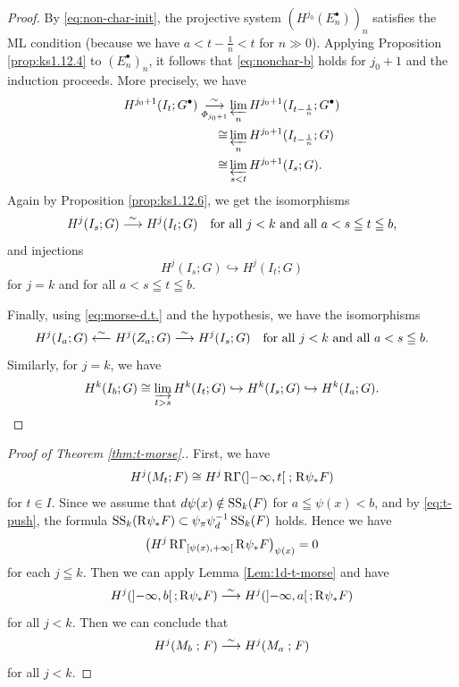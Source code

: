 \begin{proof}
  By \eqref{eq:non-char-init}, the projective system \(
    (H^{j_0}(E^{\bullet}_{n}))_{n}
  \) satisfies the ML condition (because we have \(
    a<t-\frac{1}{n}<t
  \) for \(n\gg0\)). 
  Applying Proposition \ref{prop:ks1.12.4} to \(
    (E^{\bullet}_{n})_{n}
  \), it follows that \ref{eq:nonchar-b} holds for \(j_{0}+1\) 
  and the induction proceeds. More precisely, we have \begin{align*}
    H^{j_0+1}(I_{t};G^{\bullet})
    \overunderset{\sim}{\varPhi_{j_{0}+1}}{\longrightarrow}&
    \prolim[n]H^{j_0+1}(I_{t-\frac{1}{n}};G^{\bullet})\\
    \cong&
    \prolim[n]H^{j_0+1}(I_{t-\frac{1}{n}};G)\\
    \cong&
    \prolim[s<t]H^{j_0+1}(I_{s};G).
  \end{align*}
  Again by Proposition \ref{prop:ks1.12.6}, 
  we get the isomorphisms\[
    H^{j}(I_{s};G)\simarr H^{j}(I_t;G)
    \quad
    \text{for all \(j<k\) and all \(a<s\leqq t\leqq b\),}
  \]
  and injections \[
    H^{j}(I_{s};G)\hookrightarrow H^{j}(I_t;G)
  \] for \(j=k\) and for all \(a<s\leqq t\leqq b\). 

  Finally, using \eqref{eq:morse-d.t.} and the hypothesis, 
  we have the isomorphisms\[
    H^{j}(I_{a};G)\simrra
    H^{j}(Z_{a};G)\simarr H^{j}(I_s;G)
    \quad
    \text{for all \(j<k\) and all \(a<s\leqq b\).}
  \]
  Similarly, for \(j=k\), we have\[
    H^{k}(I_{b};G) \cong \indlim[t>s] H^{k}(I_t;G)\hookrightarrow H^{k}(I_s;G) \hookrightarrow H^{k}(I_{a};G).
  \]
\end{proof}

\begin{proof}[Proof of Theorem {\ref{thm:t-morse}}.]
  First, we have\[
    H^{j}(M_{t};F)
    \cong
    H^{j}\RG(
      {\left]-\infty,t\right[}\mathrel{;}\Rder{\psi}_{\ast}F
    )
  \]
  for \(t\in I\).
  Since we assume that \(d\psi(x)\notin \muS[k](F)\) 
  for \(a\leqq \psi(x)<b\), and by \eqref{eq:t-push}, the formula \(
    \muS[k](\Rder{\psi}_{\ast}F)
    \subset \mpb[\psi]\mdiff[\psi]^{-1}\muS[k](F)
  \) holds. Hence we have\[
    \left(H^{j}\RG_{\left[\psi(x),+\infty\right[}\Rder{\psi}_{\ast}F\right)_{\psi(x)}=0
  \]for each \(j\leqq k\). 
  Then we can apply Lemma \ref{Lem:1d-t-morse} and have
  \[
    H^{j}(\left]-\infty,b\right[;\Rder{\psi_{\ast}}F)
    \simarr
    H^{j}(\left]-\infty,a\right[;\Rder{\psi_{\ast}}F)
  \] for all \(j<k\).
  Then we can conclude that
  \[
    H^{j}(M_b\mathrel{;}F)
    \simarr
    H^{j}(M_a\mathrel{;}F)
  \]
  for all \(j<k\).
  \end{proof}

